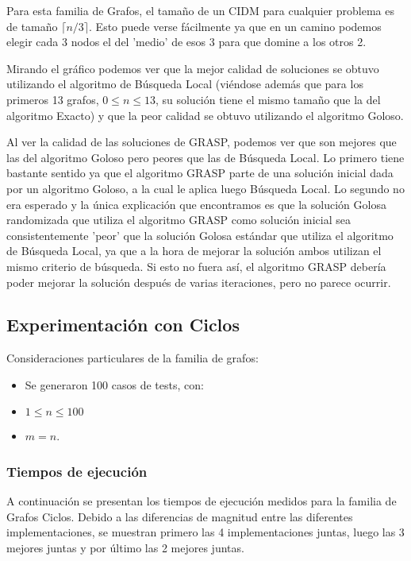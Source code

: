 Para esta familia de Grafos, el tamaño de un CIDM para cualquier problema es de tamaño $\lceil n/3 \rceil$. Esto puede verse fácilmente ya que en un camino podemos elegir cada 3 nodos el del 'medio' de esos 3 para que domine a los otros 2.

Mirando el gráfico podemos ver que la mejor calidad de soluciones se obtuvo utilizando el algoritmo de Búsqueda Local (viéndose además que para los primeros 13 grafos, $0 \leq n \leq 13$, su solución tiene el mismo tamaño que la del algoritmo Exacto) y que la peor calidad se obtuvo utilizando el algoritmo Goloso.

Al ver la calidad de las soluciones de GRASP, podemos ver que son mejores que las del algoritmo Goloso pero peores que las de Búsqueda Local. Lo primero tiene bastante sentido ya que el algoritmo GRASP parte de una solución inicial dada por un algoritmo Goloso, a la cual le aplica luego Búsqueda Local. Lo segundo no era esperado y la única explicación que encontramos es que la solución Golosa randomizada que utiliza el algoritmo GRASP como solución inicial sea consistentemente 'peor' que la solución Golosa estándar que utiliza el algoritmo de Búsqueda Local, ya que a la hora de mejorar la solución ambos utilizan el mismo criterio de búsqueda. Si esto no fuera así, el algoritmo GRASP debería poder mejorar la solución después de varias iteraciones, pero no parece ocurrir.

\subsection{Experimentación con Ciclos}

Consideraciones particulares de la familia de grafos:
\begin{itemize}
    \item Se generaron 100 casos de tests, con:
    \item $1 \leq n \leq 100$
    \item $m = n$.
\end{itemize}

\subsubsection{Tiempos de ejecución}

A continuación se presentan los tiempos de ejecución medidos para la familia de Grafos Ciclos. Debido a las diferencias de magnitud entre las diferentes implementaciones, se muestran primero las 4 implementaciones juntas, luego las 3 mejores juntas y por último las 2 mejores juntas.

